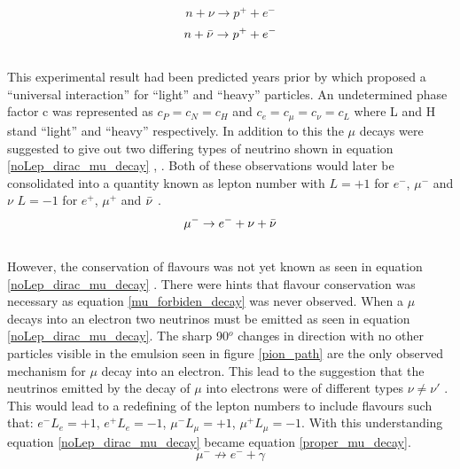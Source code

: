 \begin{equation}
    n + \nu \rightarrow p^+ + e^-
    \label{no_lepNo_dirac_nu_capture}
\end{equation}
\begin{equation}
    n + \Bar{\nu} \rightarrow p^+ + e^-
    \label{no_lepNo_maj_nu_capture}
\end{equation}
\\This experimental result had been predicted years prior by \cite{konopinski1953universal} which proposed a ``universal interaction'' for ``light'' and ``heavy'' particles. An undetermined phase factor c was represented as $c_P=c_N=c_H$ and $c_e=c_\mu=c_\nu=c_L$ where L and H stand ``light'' and ``heavy'' respectively. In addition to this the $\mu$ decays were suggested to give out two differing types of neutrino shown in equation \ref{noLep_dirac_mu_decay} \cite{griffiths2008book} \cite{griffiths2008neutrino1.5}, \cite{konopinski1953universal}. Both of these observations would later be consolidated into a quantity known as lepton number with $L=+1$ for $e^-$, $\mu^-$ and $\nu$ $L=-1$ for $e^+$, $\mu^+$ and $\Bar{\nu}$ \cite{griffiths2008book}\cite{griffiths2008neutrino1.5}. 
\begin{equation}
    \mu^- \rightarrow e^- + \nu + \Bar{\nu}
    \label{noLep_dirac_mu_decay}
\end{equation}
\\However, the conservation of flavours was not yet known as seen in equation \ref{noLep_dirac_mu_decay} \cite{griffiths2008book} \cite{griffiths2008neutrino1.5}. There were hints that flavour conservation was necessary as equation \ref{mu_forbiden_decay} was never observed. When a $\mu$ decays into an electron two neutrinos must be emitted as seen in equation \ref{noLep_dirac_mu_decay}. The sharp 90$^o$ changes in direction with no other particles visible in the emulsion seen in figure \ref{pion_path} are the only observed mechanism for $\mu$ decay into an electron. This lead to the suggestion that the neutrinos emitted by the decay of $\mu$ into electrons were of different types $\nu \not= \nu'$ \cite{Lee:1960tja} \cite{griffiths2008book} \cite{griffiths2008neutrino1.5}. This would lead to a redefining of the lepton numbers to include flavours such that: $e^- L_e = +1$, $e^+ L_e = -1$, $\mu^- L_\mu = +1 $, $\mu^+ L_\mu = -1 $. With this understanding equation \ref{noLep_dirac_mu_decay} became equation \ref{proper_mu_decay}.
\begin{equation}
    \mu^- \not\to e^- + \gamma
    \label{mu_forbiden_decay}
\end{equation}
